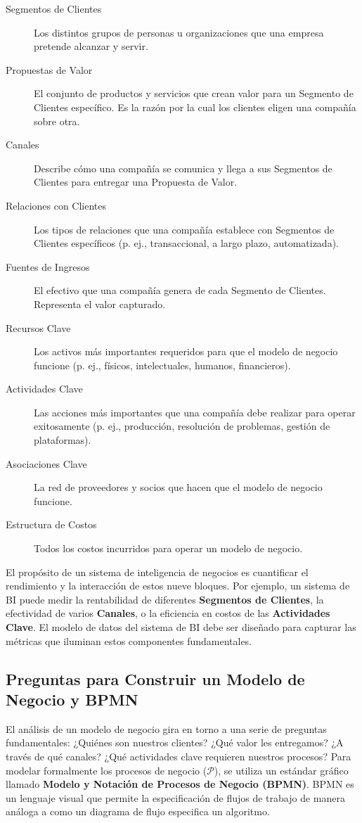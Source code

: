 \documentclass{article}
\begin{document}
\begin{description}
    \item[Segmentos de Clientes] Los distintos grupos de personas u organizaciones que una empresa pretende alcanzar y servir.
    \item[Propuestas de Valor] El conjunto de productos y servicios que crean valor para un Segmento de Clientes específico. Es la razón por la cual los clientes eligen una compañía sobre otra.
    \item[Canales] Describe cómo una compañía se comunica y llega a sus Segmentos de Clientes para entregar una Propuesta de Valor.
    \item[Relaciones con Clientes] Los tipos de relaciones que una compañía establece con Segmentos de Clientes específicos (p. ej., transaccional, a largo plazo, automatizada).
    \item[Fuentes de Ingresos] El efectivo que una compañía genera de cada Segmento de Clientes. Representa el valor capturado.
    \item[Recursos Clave] Los activos más importantes requeridos para que el modelo de negocio funcione (p. ej., físicos, intelectuales, humanos, financieros).
    \item[Actividades Clave] Las acciones más importantes que una compañía debe realizar para operar exitosamente (p. ej., producción, resolución de problemas, gestión de plataformas).
    \item[Asociaciones Clave] La red de proveedores y socios que hacen que el modelo de negocio funcione.
    \item[Estructura de Costos] Todos los costos incurridos para operar un modelo de negocio.
\end{description}

El propósito de un sistema de inteligencia de negocios es cuantificar el rendimiento y la interacción de estos nueve bloques. Por ejemplo, un sistema de BI puede medir la rentabilidad de diferentes \textbf{Segmentos de Clientes}, la efectividad de varios \textbf{Canales}, o la eficiencia en costos de las \textbf{Actividades Clave}. El modelo de datos del sistema de BI debe ser diseñado para capturar las métricas que iluminan estos componentes fundamentales.

\subsection{Preguntas para Construir un Modelo de Negocio y BPMN}
El análisis de un modelo de negocio gira en torno a una serie de preguntas fundamentales: ¿Quiénes son nuestros clientes? ¿Qué valor les entregamos? ¿A través de qué canales? ¿Qué actividades clave requieren nuestros procesos?
Para modelar formalmente los procesos de negocio ($\mathcal{P}$), se utiliza un estándar gráfico llamado \textbf{Modelo y Notación de Procesos de Negocio (BPMN)}. BPMN es un lenguaje visual que permite la especificación de flujos de trabajo de manera análoga a como un diagrama de flujo especifica un algoritmo.
\end{document}
